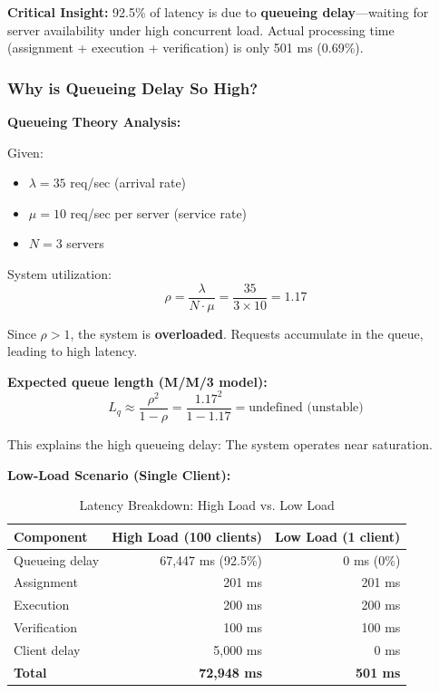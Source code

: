 \documentclass[12pt,a4paper]{article}
\begin{document}
\textbf{Critical Insight:} 92.5\% of latency is due to \textbf{queueing delay}---waiting for server availability under high concurrent load. Actual processing time (assignment + execution + verification) is only 501 ms (0.69\%).

\subsubsection{Why is Queueing Delay So High?}

\textbf{Queueing Theory Analysis:}

Given:
\begin{itemize}
    \item $\lambda = 35$ req/sec (arrival rate)
    \item $\mu = 10$ req/sec per server (service rate)
    \item $N = 3$ servers
\end{itemize}

System utilization:
\begin{equation}
\rho = \frac{\lambda}{N \cdot \mu} = \frac{35}{3 \times 10} = 1.17
\end{equation}

Since $\rho > 1$, the system is \textbf{overloaded}. Requests accumulate in the queue, leading to high latency.

\textbf{Expected queue length (M/M/3 model):}
\begin{equation}
L_q \approx \frac{\rho^2}{1 - \rho} = \frac{1.17^2}{1 - 1.17} = \text{undefined (unstable)}
\end{equation}

This explains the high queueing delay: The system operates near saturation.

\textbf{Low-Load Scenario (Single Client):}

\begin{table}[h]
\centering
\caption{Latency Breakdown: High Load vs. Low Load}
\label{tab:high-vs-low}
\begin{tabular}{@{}lrr@{}}
\toprule
\textbf{Component} & \textbf{High Load (100 clients)} & \textbf{Low Load (1 client)} \\
\midrule
Queueing delay & 67,447 ms (92.5\%) & 0 ms (0\%) \\
Assignment & 201 ms & 201 ms \\
Execution & 200 ms & 200 ms \\
Verification & 100 ms & 100 ms \\
Client delay & 5,000 ms & 0 ms \\
\textbf{Total} & \textbf{72,948 ms} & \textbf{501 ms} \\
\bottomrule
\end{tabular}
\end{table}
\end{document}

